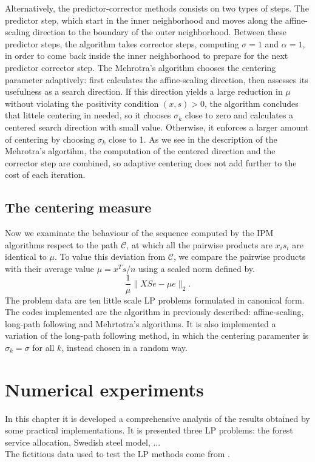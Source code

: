 \documentclass[a4paper,10 pt,titlepage,twoside]{book}
\theoremstyle{plain}
\theoremstyle{definition}
\theoremstyle{remark}
\begin{document}
Alternatively, the predictor-corrector methods consists on two types of steps. The predictor step, which start in the inner neighborhood and moves along the affine-scaling direction to the boundary of the outer neighborhood. Between these predictor steps, the algorithm takes corrector steps, computing $\sigma = 1$ and $\alpha= 1$, in order to come back inside the inner neighborhood to prepare for the next predictor corrector step. The Mehrotra's algorithm chooses the centering parameter adaptively: first calculates the affine-scaling direction, then assesses its usefulness as a search direction. If this direction yields a large reduction in $\mu$ without violating the positivity condition $(x, s)> 0$, the algorithm concludes that littele centering in needed, so it chooses $\sigma_{k}$ close to zero and calculates a centered search direction with small value. Otherwise, it enforces a larger amount of centering by choosing $\sigma_{k}$ close to 1. As we see in the description of the Mehrotra's algortihm, the computation of the centered direction and the corrector step are combined, so adaptive centering does not add further to the cost of each iteration. 

\section*{The centering measure}
Now we examinate the behaviour of the sequence computed by the IPM algorithms respect to the path $\mathcal{C}$, at which all the pairwise products are $x_{i}s_{i}$ are identical to $\mu$. To value this deviation from $\mathcal{C}$, we compare the pairwise products with their average value $\mu = x^{T}s/n$ using a scaled norm defined by. 
\begin{equation}
\frac{1}{\mu}\lVert XSe - \mu e \rVert_{2}.
\end{equation}
The problem data are ten little scale LP problems formulated in canonical form. The codes implemented are the algorithm in previously described: affine-scaling, long-path following and Mehrtotra's algorithms. It is also implemented a variation of the long-path following method, in which the centering paramenter is $\sigma_{k}=\sigma$ for all $k$, instead chosen in a random way.



\chapter{Numerical experiments}
In this chapter it is developed a comprehensive analysis of the results obtained by some practical implementations. It is presented three LP problems: the forest service allocation, Swedish steel model, ...\\
The fictitious data used to test the LP methods come from \cite{RR}.
\end{document}

